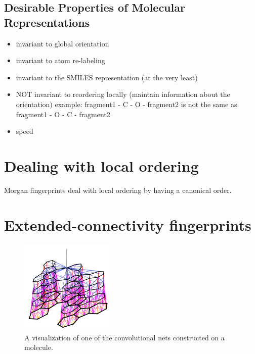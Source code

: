 \documentclass{article}
\begin{document}
\subsection{Desirable Properties of Molecular Representations}

\begin{itemize}
\item invariant to global orientation
\item invariant to atom re-labeling
\item invariant to the SMILES representation (at the very least)
\item NOT invariant to reordering locally (maintain information about the orientation)
    example:  fragment1 - C - O - fragment2 is not the same as fragment1 - O - C - fragment2 
   \item speed
\end{itemize}

\cite{erhan2006collaborative}
\cite{ma_qsar_2015}

\section{Dealing with local ordering}

Morgan fingerprints deal with local ordering by having a canonical order.



\section{Extended-connectivity fingerprints}

\begin{figure}
\centerline{\includegraphics[width=0.4\textwidth]{figures/3d-nets/net1}}
\caption{A visualization of one of the convolutional nets constructed on a molecule.}
\label{placeholder}
\end{figure}
\end{document}
